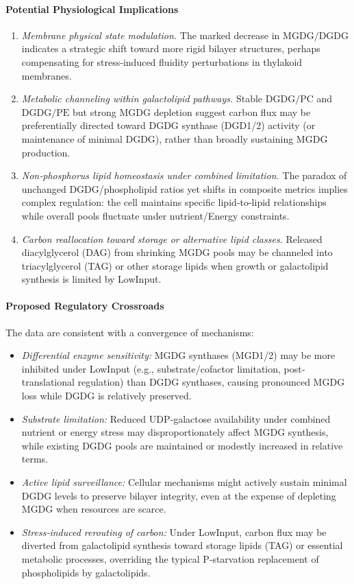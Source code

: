 \documentclass[10pt,letterpaper]{article}
\begin{document}
\paragraph{Potential Physiological Implications}
\begin{enumerate}
  \item \textit{Membrane physical state modulation.}  
        The marked decrease in \(\mathrm{MGDG/DGDG}\) indicates a strategic shift toward more rigid bilayer structures, perhaps compensating for stress‐induced fluidity perturbations in thylakoid membranes.
  \item \textit{Metabolic channeling within galactolipid pathways.}  
        Stable \(\mathrm{DGDG/PC}\) and \(\mathrm{DGDG/PE}\) but strong MGDG depletion suggest carbon flux may be preferentially directed toward DGDG synthase (DGD1/2) activity (or maintenance of minimal DGDG), rather than broadly sustaining MGDG production.
  \item \textit{Non‐phosphorus lipid homeostasis under combined limitation.}  
        The paradox of unchanged DGDG/phospholipid ratios yet shifts in composite metrics implies complex regulation: the cell maintains specific lipid‐to‐lipid relationships while overall pools fluctuate under nutrient/Energy constraints.
  \item \textit{Carbon reallocation toward storage or alternative lipid classes.}  
        Released diacylglycerol (DAG) from shrinking MGDG pools may be channeled into triacylglycerol (TAG) or other storage lipids when growth or galactolipid synthesis is limited by LowInput.
\end{enumerate}

\paragraph{Proposed Regulatory Crossroads}
The data are consistent with a convergence of mechanisms:
\begin{itemize}
  \item \textit{Differential enzyme sensitivity:} MGDG synthases (MGD1/2) may be more inhibited under LowInput (e.g., substrate/cofactor limitation, post‐translational regulation) than DGDG synthases, causing pronounced MGDG loss while DGDG is relatively preserved.
  \item \textit{Substrate limitation:} Reduced UDP‐galactose availability under combined nutrient or energy stress may disproportionately affect MGDG synthesis, while existing DGDG pools are maintained or modestly increased in relative terms.
  \item \textit{Active lipid surveillance:} Cellular mechanisms might actively sustain minimal DGDG levels to preserve bilayer integrity, even at the expense of depleting MGDG when resources are scarce.
  \item \textit{Stress‐induced rerouting of carbon:} Under LowInput, carbon flux may be diverted from galactolipid synthesis toward storage lipids (TAG) or essential metabolic processes, overriding the typical P‐starvation replacement of phospholipids by galactolipids.
\end{itemize}
\end{document}
